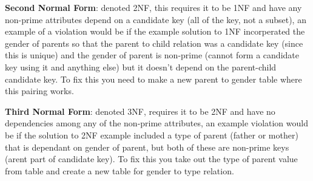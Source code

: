 \documentclass{article}
\begin{document}
\textbf{Second Normal Form}: denoted 2NF, this requires it to be 1NF and have any non-prime attributes depend on a candidate key (all of the key, not a subset), an example of a violation would be if the example solution to 1NF incorperated the gender of parents so that the parent to child relation was a candidate key (since this is unique) and the gender of parent is non-prime (cannot form a candidate key using it and anything else) but it doesn't depend on the parent-child candidate key. To fix this you need to make a new parent to gender table where this pairing works.

\textbf{Third Normal Form}: denoted 3NF, requires it to be 2NF and have no dependencies among any of the non-prime attributes, an example violation would be if the solution to 2NF example included a type of parent (father or mother) that is dependant on gender of parent, but both of these are non-prime keys (arent part of candidate key). To fix this you take out the type of parent value from table and create a new table for gender to type relation.


\end{document}
